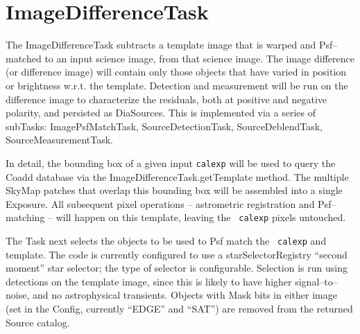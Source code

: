 \documentclass[12pt]{article}
\begin{document}
\section{ImageDifferenceTask \label{sec-imagedifftask}} 



The ImageDifferenceTask subtracts a template image that is
warped and Psf--matched to an input science image, from that science image.  The
image difference (or difference image) will contain only those objects
that have varied in position or brightness w.r.t. the template.
Detection and measurement will be run on the difference image to
characterize the residuals, both at positive and negative polarity,
and persisted as DiaSources.  This is implemented via a series of
subTasks: ImagePsfMatchTask, SourceDetectionTask, SourceDeblendTask,
SourceMeasurementTask.

In detail, the bounding box of a given input {\tt calexp} will be used
to query the Coadd database via the ImageDifferenceTask.getTemplate
method.  The multiple SkyMap patches that overlap this bounding box
will be assembled into a single Exposure.  All
subsequent pixel operations -- astrometric registration and
Psf--matching -- will happen on this template, leaving the {\tt
  calexp} pixels untouched.  

The Task next selects the objects to be used to Psf match the {\tt
  calexp} and template.  The code is currently configured to use a
starSelectorRegistry ``second moment'' star selector; the type of selector is configurable.  
Selection is run using detections on the template image,
since this is likely to have higher signal--to--noise, and no
astrophysical transients.  Objects with Mask
bits in either image (set in the Config, currently ``EDGE'' and
``SAT'') are removed from the returned Source catalog.
\end{document}
